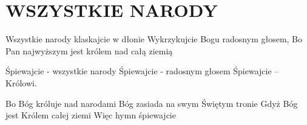 \documentclass[../../../songbook.tex]{subfiles}
\begin{document}
\TabPositions{8cm} %
\section*{WSZYSTKIE NARODY}
{}
\vspace{0.5cm}
Wszystkie narody klaskajcie w dłonie			 \newline
Wykrzykujcie Bogu radosnym głosem,			 \newline
Bo Pan najwyższym jest królem nad całą ziemią	 \newline

Śpiewajcie - wszystkie narody	 \newline
Śpiewajcie - radosnym głosem	 \newline
Śpiewajcie – Królowi.			 \newline

\-\hspace{1cm} Bo Bóg króluje nad narodami				 \newline
\-\hspace{1cm} Bóg zasiada na swym Świętym tronie		 \newline
\-\hspace{1cm} Gdyż Bóg jest Królem całej ziemi			 \newline
\-\hspace{1cm} Więc hymn śpiewajcie						 \newline
\end{document}
